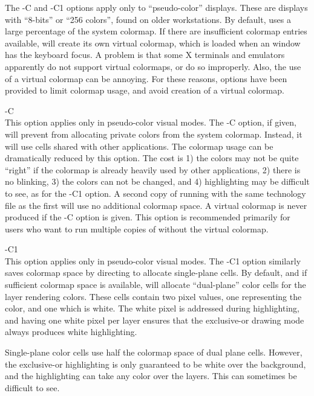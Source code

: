 The {\et -C} and {\et -C1} options apply only to ``pseudo-color''
displays.  These are displays with ``8-bits'' or ``256 colors'', found
on older workstations.  By default, {\Xic} uses a large percentage of
the system colormap.  If there are insufficient colormap entries
available, {\Xic} will create its own virtual colormap, which is
loaded when an {\Xic} window has the keyboard focus.  A problem is
that some X terminals and emulators apparently do not support virtual
colormaps, or do so improperly.  Also, the use of a virtual colormap
can be annoying.  For these reasons, options have been provided to
limit colormap usage, and avoid creation of a virtual colormap.

\begin{description}
\item{\et -C}\\
This option applies only in pseudo-color visual modes.  The {\et -C}
option, if given, will prevent {\Xic} from allocating private colors
from the system colormap.  Instead, it will use cells shared with
other applications.  The colormap usage can be dramatically reduced by
this option.  The cost is 1) the colors may not be quite ``right'' if
the colormap is already heavily used by other applications, 2) there
is no blinking, 3) the colors can not be changed, and 4) highlighting
may be difficult to see, as for the {\vt -C1} option.  A second copy
of {\Xic} running with the same technology file as the first will use
no additional colormap space.  A virtual colormap is never produced if
the {\et -C} option is given.  This option is recommended primarily
for users who want to run multiple copies of {\Xic} without the
virtual colormap.

\item{\et -C1}\\
This option applies only in pseudo-color visual modes.  The {\et -C1}
option similarly saves colormap space by directing {\Xic} to allocate
single-plane cells.  By default, and if sufficient colormap space is
available, {\Xic} will allocate ``dual-plane'' color cells for the
layer rendering colors.  These cells contain two pixel values, one
representing the color, and one which is white.  The white pixel is
addressed during highlighting, and having one white pixel per layer
ensures that the exclusive-or drawing mode always produces white
highlighting.

Single-plane color cells use half the colormap space of dual plane
cells.  However, the exclusive-or highlighting is only guaranteed to
be white over the background, and the highlighting can take any color
over the layers.  This can sometimes be difficult to see.


\end{description}
